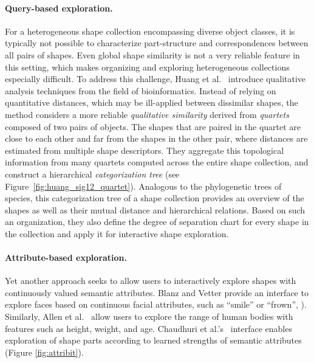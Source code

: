 

\paragraph*{Query-based exploration.}
For a heterogeneous shape collection encompassing diverse object classes, it is typically not possible to characterize part-structure and correspondences between all pairs of shapes. Even global shape similarity is not a very reliable feature in this setting, which makes organizing and exploring heterogeneous collections especially difficult.
To address this challenge, Huang et al.~\cite{Huang:2013:QOC} introduce qualitative analysis techniques from the field of bioinformatics. Instead of relying on quantitative distances, which may be ill-applied between dissimilar shapes, the method considers a more reliable \emph{qualitative similarity} derived from \emph{quartets} composed of two pairs of objects. The shapes that are paired in the quartet are close to each other and far from the shapes in the other pair, where distances are estimated from multiple shape descriptors.  They aggregate this topological information from many quartets computed across the entire shape collection, and construct a hierarchical \emph{categorization tree} (see Figure~\ref{fig:huang_sig12_quartet}). Analogous to the phylogenetic trees of species, this categorization tree of a shape collection provides an overview of the shapes as well as their mutual distance and hierarchical relations. Based on such an organization, they also define the degree of separation chart for every shape in the collection and apply it for interactive shape exploration.

\paragraph*{Attribute-based exploration.}
Yet another approach seeks to allow users to interactively explore shapes with continuously valued semantic attributes.  Blanz and Vetter \cite{Blanz:1999:MMS} provide an interface to explore faces based on continuous facial attributes, such as ``smile'' or ``frown'', ). Similarly, Allen et al.~\cite{Allen:2003:SHB} allow users to explore the range of human bodies with features such as height, weight, and age. Chaudhuri et al.'s~\cite{Chaudhuri:2013:ACC} interface enables exploration of shape parts according to learned strengths of semantic attributes (Figure \ref{fig:attribit}). 